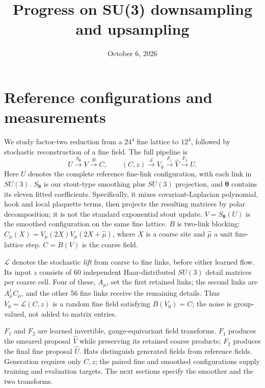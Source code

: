 \documentclass[aps,prd,superscriptaddress,nofootinbib,eqsecnum,floatfix,amsmath,longbibliography]{revtex4-2}
\newcommand{\SU}{SU(3)}
\begin{document}
\title{Progress on SU(3) downsampling and upsampling}
\author{}
\date{October 6, 2026}
\maketitle

\section{Reference configurations and measurements}
We study factor-two reduction from a $24^4$ fine lattice to $12^4$, followed
by stochastic reconstruction of a fine field. The full pipeline is
\begin{equation}
 U\xrightarrow{S_{\bm\theta}}V\xrightarrow{B}C,
 \qquad (C,z)\xrightarrow{\mathcal L}V_0
 \xrightarrow{F_1}\widehat V\xrightarrow{F_2}\widehat U.
\end{equation}
Here $U$ denotes the complete reference fine-link configuration, with each
link in $\SU$. $S_{\bm\theta}$ is our stout-type smoothing plus $\SU$
projection, and $\bm\theta$ contains its eleven fitted coefficients.
Specifically, it mixes covariant-Laplacian polynomial, hook and local
plaquette terms, then projects the resulting matrices by polar decomposition;
it is not the standard exponential stout update. $V=S_{\bm\theta}(U)$ is
the smoothed configuration on the same fine lattice. $B$ is two-link
blocking: $C_\mu(X)=V_\mu(2X)V_\mu(2X+\hat\mu)$, where $X$ is a coarse
site and $\hat\mu$ a unit fine-lattice step. $C=B(V)$ is the coarse field.

$\mathcal L$ denotes the stochastic \emph{lift} from coarse to fine links,
before either learned flow. Its input $z$ consists of 60 independent
Haar-distributed $\SU$ detail matrices per coarse cell. Four of these,
$A_\mu$, set the first retained links; the second links are $A_\mu^\dagger
C_\mu$, and the other 56 fine links receive the remaining details.
Thus $V_0=\mathcal L(C,z)$ is a random fine field satisfying $B(V_0)=C$;
the noise is group-valued, not added to matrix entries.

$F_1$ and $F_2$ are learned invertible, gauge-equivariant field transforms.
$F_1$ produces the smeared proposal $\widehat V$ while preserving its
retained coarse products; $F_2$ produces the final fine proposal
$\widehat U$. Hats distinguish generated fields from reference fields.
Generation requires only $C,z$; the paired fine and smoothed configurations supply
training and evaluation targets. The next sections specify the smoother
and the two transforms.
\end{document}
